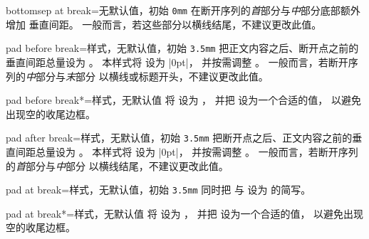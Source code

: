 \begin{docTcbKey}{bottomsep at break}{=}{无默认值，初始 \texttt{0mm}}
  在断开序列的\emph{首}部分与\emph{中}部分底部额外增加  垂直间距。
  一般而言，若这些部分以横线结尾，不建议更改此值。
\end{docTcbKey}

\begin{docTcbKey}{pad before break}{=}{样式，无默认值，初始 \texttt{3.5mm}}
  把正文内容之后、断开点之前的垂直间距总量设为 。
  本样式将  设为 |0pt|，
  并按需调整 。
  一般而言，若断开序列的\emph{中}部分与\emph{末}部分
  以横线或标题开头，不建议更改此值。
\end{docTcbKey}

\begin{docTcbKey}{pad before break*}{=}{样式，无默认值}
  将  设为 ，
  并把  设为一个合适的值，
  以避免出现空的收尾边框。
\end{docTcbKey}

\begin{docTcbKey}{pad after break}{=}{样式，无默认值，初始 \texttt{3.5mm}}
  把断开点之后、正文内容之前的垂直间距总量设为 。
  本样式将  设为 |0pt|，
  并按需调整 。
  一般而言，若断开序列的\emph{首}部分与\emph{中}部分
  以横线结尾，不建议更改此值。
\end{docTcbKey}

\begin{docTcbKey}{pad at break}{=}{样式，无默认值，初始 \texttt{3.5mm}}
  同时把  与 
  设为  的简写。
\end{docTcbKey}

\enlargethispage*{10mm}

\begin{docTcbKey}{pad at break*}{=}{样式，无默认值}
  将  设为 ，
  并把  设为一个合适的值，
  以避免出现空的收尾边框。
\end{docTcbKey}

\begin{dispListing}

\begin{tcolorbox}[enhanced jigsaw,breakable,pad at break*=0mm,
  title={For this box, the pad space at the break point is set to 0mm}]
  \lipsum[1-2]
\end{tcolorbox}
\end{dispListing}
{\tcbusetemp}



